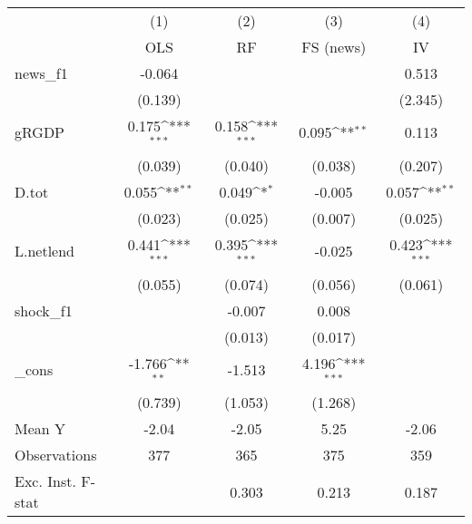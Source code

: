 {
\def\sym#1{\ifmmode^{#1}\else\(^{#1}\)\fi}
\begin{tabular}{l*{4}{c}}
\toprule
            &\multicolumn{1}{c}{(1)}&\multicolumn{1}{c}{(2)}&\multicolumn{1}{c}{(3)}&\multicolumn{1}{c}{(4)}\\
            &\multicolumn{1}{c}{OLS}&\multicolumn{1}{c}{RF}&\multicolumn{1}{c}{FS (news)}&\multicolumn{1}{c}{IV}\\
\midrule
news\_f1     &      -0.064         &                     &                     &       0.513         \\
            &     (0.139)         &                     &                     &     (2.345)         \\
\addlinespace
gRGDP       &       0.175\sym{***}&       0.158\sym{***}&       0.095\sym{**} &       0.113         \\
            &     (0.039)         &     (0.040)         &     (0.038)         &     (0.207)         \\
\addlinespace
D.tot       &       0.055\sym{**} &       0.049\sym{*}  &      -0.005         &       0.057\sym{**} \\
            &     (0.023)         &     (0.025)         &     (0.007)         &     (0.025)         \\
\addlinespace
L.netlend   &       0.441\sym{***}&       0.395\sym{***}&      -0.025         &       0.423\sym{***}\\
            &     (0.055)         &     (0.074)         &     (0.056)         &     (0.061)         \\
\addlinespace
shock\_f1    &                     &      -0.007         &       0.008         &                     \\
            &                     &     (0.013)         &     (0.017)         &                     \\
\addlinespace
\_cons      &      -1.766\sym{**} &      -1.513         &       4.196\sym{***}&                     \\
            &     (0.739)         &     (1.053)         &     (1.268)         &                     \\
\midrule
Mean Y      &       -2.04         &       -2.05         &        5.25         &       -2.06         \\
Observations&         377         &         365         &         375         &         359         \\
Exc. Inst. F-stat&                     &       0.303         &       0.213         &       0.187         \\
\bottomrule
\end{tabular}
}

